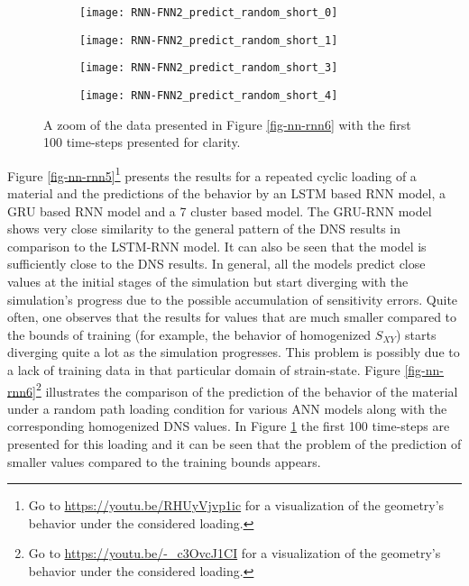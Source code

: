\begin{figure}
	\centering
	\begin{subfigure}[t]{0.45\textwidth}
	\texttt{[image: RNN-FNN2\_predict\_random\_short\_0]}
\end{subfigure}
\begin{subfigure}[t]{0.45\textwidth}
	\texttt{[image: RNN-FNN2\_predict\_random\_short\_1]}
\end{subfigure}
\begin{subfigure}[t]{0.45\textwidth}
	\texttt{[image: RNN-FNN2\_predict\_random\_short\_3]}
\end{subfigure}
\begin{subfigure}[t]{0.45\textwidth}
	\texttt{[image: RNN-FNN2\_predict\_random\_short\_4]}
\end{subfigure}
	\caption{A zoom of the data presented in Figure \ref{fig-nn-rnn6} with the first 100 time-steps presented for clarity.}\label{fig-nn-rnn7}
\end{figure}

Figure \ref{fig-nn-rnn5}\footnote{Go to \url{https://youtu.be/RHUyVjvp1ic} for a visualization of the geometry's behavior under the considered loading.} presents the results for a repeated cyclic loading of a material and the predictions of the behavior by an LSTM based RNN model, a GRU based RNN model and a 7 cluster based \fnn model. The GRU-RNN model shows very close similarity to the general pattern of the DNS results in comparison to the LSTM-RNN model. It can also be seen that the \fnn model is sufficiently close to the DNS results. In general, all the models predict close values at the initial stages of the simulation but start diverging with the simulation's progress due to the possible accumulation of sensitivity errors. Quite often, one observes that the results for values that are much smaller compared to the bounds of training (for example, the behavior of homogenized $ S_{XY} $) starts diverging quite a lot as the simulation progresses. This problem is possibly due to a lack of training data in that particular domain of strain-state. Figure \ref{fig-nn-rnn6}\footnote{Go to  \url{https://youtu.be/-_c3OvcJ1CI} for a visualization of the geometry's behavior under the considered loading.} illustrates the comparison of the prediction of the behavior of the material under a random path loading condition for various ANN models along with the corresponding homogenized DNS values. In Figure \ref{fig-nn-rnn7} the first 100 time-steps are presented for this loading and it can be seen that the problem of the prediction of smaller values compared to the training bounds appears.

